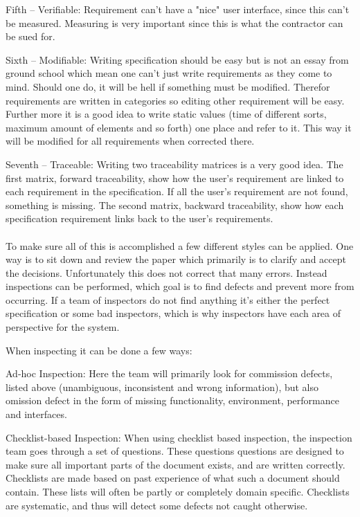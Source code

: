 \documentclass[Main]{subfiles}
\begin{document}
Fifth -- Verifiable:
Requirement can't have a "nice" user interface, since this can't be measured.
Measuring is very important since this is what the contractor can be sued for.

Sixth -- Modifiable:
Writing specification should be easy but is not an essay from ground school which mean one can't just write requirements as they come to mind.
Should one do, it will be hell if something must be modified.
Therefor requirements are written in categories so editing other requirement will be easy.
Further more it is a good idea to write static values (time of different sorts, maximum amount of elements and so forth) one place and refer to it.
This way it will be modified for all requirements when corrected there.

Seventh -- Traceable:
Writing two traceability matrices is a very good idea.
The first matrix, forward traceability, show how the user's requirement are linked to each requirement in the specification.
If all the user's requirement are not found, something is missing.
The second matrix, backward traceability, show how each specification requirement links back to the user's requirements.
\\
\\
To make sure all of this is accomplished a few different styles can be applied.
One way is to sit down and review the paper which primarily is to clarify and accept the decisions.
Unfortunately this does not correct that many errors. 
Instead inspections can be performed, which goal is to find defects and prevent more from occurring.
If a team of inspectors do not find anything it's either the perfect specification or some bad inspectors, which is why inspectors have each area of perspective for the system. 

When inspecting it can be done a few ways:


Ad-hoc Inspection:
Here the team will primarily look for commission defects, listed above (unambiguous, inconsistent and wrong information), but also omission defect in the form of missing functionality, environment, performance and interfaces.


Checklist-based Inspection:
When using checklist based inspection, the inspection team goes through a set of questions. These questions questions are designed to make sure all important parts of the document exists, and are written correctly. Checklists are made based on past experience of what such a document should contain. These lists will often be partly or completely domain specific. Checklists are systematic, and thus will detect some defects not caught otherwise.
\end{document}
